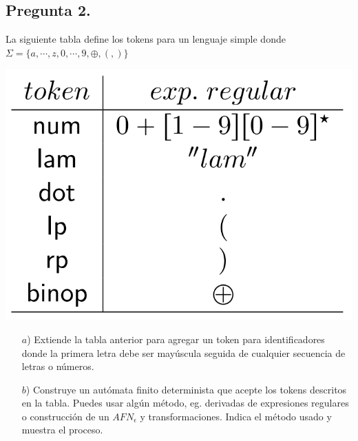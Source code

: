 \subsection*{Pregunta 2.} La siguiente tabla define los tokens para un lenguaje simple donde
$\Sigma = \{a, \dotsm, z, 0, \dotsm, 9, \oplus, (, )\}$
\begin{center}
  \includegraphics[scale=0.20]{./Tabla.png}
\end{center}
\begin{itemize}
\item[$a$)] Extiende la tabla anterior para agregar un token para identificadores donde la
  primera letra debe ser mayúscula seguida de cualquier secuencia de letras o números.
\item[$b$)] Construye un autómata finito determinista que acepte los tokens descritos en la tabla.
  Puedes usar algún método, eg. derivadas de expresiones regulares o construcción de un $AFN_{\epsilon}$ y
  transformaciones. Indica el método usado y muestra el proceso.
\end{itemize}
